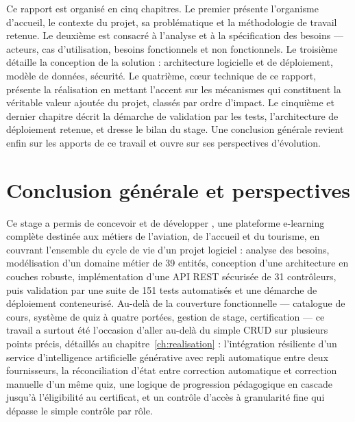 \documentclass[12pt,a4paper,oneside]{report}
\begin{document}
Ce rapport est organisé en cinq chapitres. Le premier présente l'organisme
d'accueil, le contexte du projet, sa problématique et la méthodologie de
travail retenue. Le deuxième est consacré à l'analyse et à la
spécification des besoins --- acteurs, cas d'utilisation, besoins
fonctionnels et non fonctionnels. Le troisième détaille la conception de
la solution : architecture logicielle et de déploiement, modèle de
données, sécurité. Le quatrième, cœur technique de ce rapport, présente la
réalisation en mettant l'accent sur les mécanismes qui constituent la
véritable valeur ajoutée du projet, classés par ordre d'impact. Le
cinquième et dernier chapitre décrit la démarche de validation par les
tests, l'architecture de déploiement retenue, et dresse le bilan du stage.
Une conclusion générale revient enfin sur les apports de ce travail et
ouvre sur ses perspectives d'évolution.







\clearpage
\chapter*{Conclusion générale et perspectives}

Ce stage a permis de concevoir et de développer
\Entreprise, une plateforme e-learning complète destinée aux métiers de
l'aviation, de l'accueil et du tourisme, en couvrant l'ensemble du cycle de
vie d'un projet logiciel : analyse des besoins, modélisation d'un domaine
métier de 39 entités, conception d'une architecture en couches robuste,
implémentation d'une API REST sécurisée de 31 contrôleurs, puis validation
par une suite de 151 tests automatisés et une démarche de déploiement
conteneurisé. Au-delà de la couverture fonctionnelle --- catalogue de
cours, système de quiz à quatre portées, gestion de stage, certification
--- ce travail a surtout été l'occasion d'aller au-delà du simple CRUD sur
plusieurs points précis, détaillés au chapitre~\ref{ch:realisation} :
l'intégration résiliente d'un service d'intelligence artificielle
générative avec repli automatique entre deux fournisseurs, la
réconciliation d'état entre correction automatique et correction manuelle
d'un même quiz, une logique de progression pédagogique en cascade jusqu'à
l'éligibilité au certificat, et un contrôle d'accès à granularité fine qui
dépasse le simple contrôle par rôle.
\end{document}
